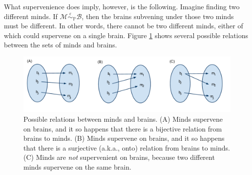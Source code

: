 \documentclass{article}
\newcommand{\mB}{\mathcal{B}}
\newcommand{\mM}{\mathcal{M}}
\newcommand{\PP}{\mathbb{P}}           %
\newcommand{\MeB}{\mM \overset{\varepsilon}{{\sim}}_{\PP} \mB}
\begin{document}
What supervenience does imply, however, is the following.   Imagine finding two different minds.  If $\MeB$, then the brains subvening under those two minds must be different.  In other words, there cannot be two different minds, either of which could supervene on a single brain.  Figure \ref{fig:rel} shows several possible relations between the sets of minds and brains.

\begin{figure}[htbp]
	\centering
		\includegraphics[width=1\linewidth]{supervenience_relations.pdf}
	\caption{Possible relations between minds and brains.  (A) Minds supervene on brains, and it so happens that there is a bijective relation from brains to minds.  (B) Minds supervene on brains, and it so happens that there is a surjective (a.k.a., onto) relation from brains to minds. (C) Minds are \emph{not} supervenient on brains, because two different minds supervene on the same brain.}
	\label{fig:rel}
\end{figure}
\end{document}
